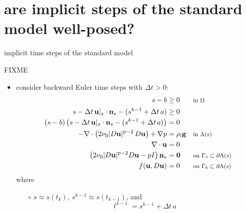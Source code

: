 \documentclass[10pt,svgnames]{beamer}
\newcommand{\bg}{\mathbf{g}}
\newcommand{\bn}{\mathbf{n}}
\newcommand{\bu}{\mathbf{u}}
\newcommand{\bzero}{\bm{0}}
\newcommand{\pp}{\mathrm{p}}
\newcommand{\rhoi}{\rho_{\text{i}}}
\newcommand{\where}[1]{\text{\footnotesize #1}}
\begin{document}
\section{are implicit steps of the standard model well-posed?}

\begin{frame}{implicit time steps of the standard model}

FIXME

\begin{itemize}
\item consider backward Euler time steps with $\Delta t>0$:
\begin{align*}
s - b &\ge 0 & &\where{in $\Omega$} \\
s - \Delta t\, \bu|_s \cdot \bn_s - (s^{k-1} + \Delta t\,a) &\ge 0 \\
(s - b) \left(s - \Delta t\, \bu|_s \cdot \bn_s - (s^{k-1} + \Delta t\,a)\right) &= 0 \\
- \nabla \cdot \left(2 \nu_0 |D\bu|^{\pp-2}\, D\bu\right) + \nabla p &= \rhoi \bg && \where{in $\Lambda(s)$} \\
\nabla \cdot \bu &= 0 \\
\left(2 \nu_0 |D\bu|^{\pp-2} D\bu - pI\right) \bn_s &= \bzero && \where{on $\Gamma_s \subset \partial\Lambda(s)$} \\
f(\bu,D\bu) &= 0 && \where{on $\Gamma_b \subset \partial\Lambda(s)$}
\end{align*}
where
    \begin{itemize}
    \item[$\circ$] $s \approx s(t_k)$, $s^{k-1}\approx s(t_{k-1})$, and
        $$\ell^{k-1} = s^{k-1} + \Delta t\,a$$
    \end{itemize}
\end{itemize}
\end{frame}
\end{document}
